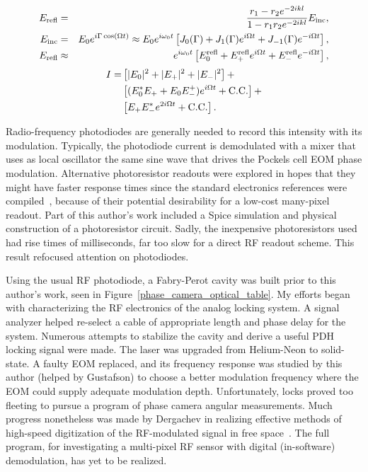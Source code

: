 \begin{eqnarray}
E_{\textup{refl}} &=& \frac{r_1 - r_2 e^{-2 i k l}}{1 - r_1 r_2 e^{-2 i k l}} E_\textup{inc},\\
E_\textup{inc} &=& E_0 e^{i \Gamma \cos \left( \Omega t \right)} \approx E_0 e^{i \omega_0 t} \left[ J_0 (\Gamma) + J_1 (\Gamma) e^{i\Omega t} + J_{-1} (\Gamma) e^{-i \Omega t} \right],\\
E_\textup{refl} &\approx& e^{i \omega_0 t} \left[ E_0^\textup{refl} + E_+^\textup{refl} e^{i\Omega t} + E_-^\textup{refl} e^{-i \Omega t}\right],
\end{eqnarray}
\begin{equation}
\begin{split}
I =& \left[ |E_0|^2 + |E_+|^2 + |E_-|^2\right] + \\ 
  & \left[(E_0^* E_+ + E_0 E^+_-)e^{i\Omega t} +\textup{C.C.} \right] + \\
  &\left[E_+ E_-^* e^{2i\Omega t} +\textup{C.C.} \right].
\end{split}
\end{equation}

Radio-frequency photodiodes are generally needed to record this intensity with its modulation.
Typically, the photodiode current is demodulated with a mixer that uses as local oscillator the same sine wave that drives the Pockels cell EOM phase modulation.
Alternative photoresistor readouts were explored in hopes that they might have faster response times since the standard electronics references were compiled~\cite{HorowitzHill1989,Simpson}, because of their potential desirability for a low-cost many-pixel readout.
Part of this author's work included a Spice simulation and physical construction of a photoresistor circuit.
Sadly, the inexpensive photoresistors used had rise times of milliseconds, far too slow for a direct RF readout scheme. 
This result refocused attention on photodiodes.

Using the usual RF photodiode, a Fabry-Perot cavity was built prior to this author's work, seen in Figure~\ref{phase_camera_optical_table}.
My efforts began with characterizing the RF electronics of the analog locking system.
A signal analyzer helped re-select a cable of appropriate length and phase delay for the system. 
Numerous attempts to stabilize the cavity and derive a useful PDH locking signal were made.
The laser was upgraded from Helium-Neon to solid-state.
A faulty EOM replaced, and its frequency response was studied by this author (helped by Gustafson) to choose a better modulation frequency where the EOM could supply adequate modulation depth.
Unfortunately, locks proved too fleeting to pursue a program of phase camera angular measurements.
Much progress nonetheless was made by Dergachev in realizing effective methods of high-speed digitization of the RF-modulated signal in free space~\cite{DergachevThesis}.
The full program, for investigating a multi-pixel RF sensor with digital (in-software) demodulation, has yet to be realized.


